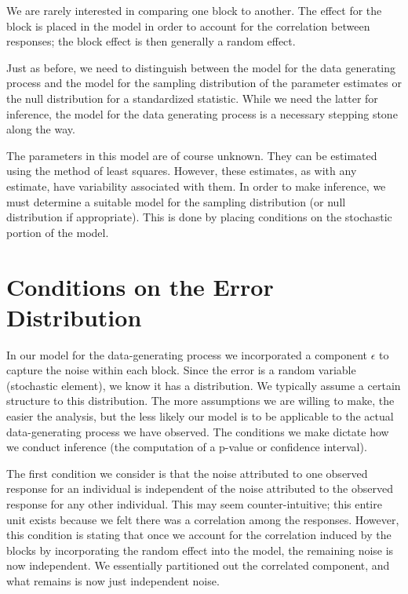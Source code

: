 \documentclass[
]{book}
\theoremstyle{plain}
\theoremstyle{mydefn}
\theoremstyle{myexmpl}
\theoremstyle{remark}
\begin{document}
\begin{rmdtip}
We are rarely interested in comparing one block to another. The effect for the block is placed in the model in order to account for the correlation between responses; the block effect is then generally a random effect.
\end{rmdtip}

Just as before, we need to distinguish between the model for the data generating process and the model for the sampling distribution of the parameter estimates or the null distribution for a standardized statistic. While we need the latter for inference, the model for the data generating process is a necessary stepping stone along the way.

The parameters in this model are of course unknown. They can be estimated using the method of least squares. However, these estimates, as with any estimate, have variability associated with them. In order to make inference, we must determine a suitable model for the sampling distribution (or null distribution if appropriate). This is done by placing conditions on the stochastic portion of the model.

\hypertarget{conditions-on-the-error-distribution-2}{%
\section{Conditions on the Error Distribution}\label{conditions-on-the-error-distribution-2}}

In our model for the data-generating process we incorporated a component \(\epsilon\) to capture the noise within each block. Since the error is a random variable (stochastic element), we know it has a distribution. We typically assume a certain structure to this distribution. The more assumptions we are willing to make, the easier the analysis, but the less likely our model is to be applicable to the actual data-generating process we have observed. The conditions we make dictate how we conduct inference (the computation of a p-value or confidence interval).

The first condition we consider is that the noise attributed to one observed response for an individual is independent of the noise attributed to the observed response for any other individual. This may seem counter-intuitive; this entire unit exists because we felt there was a correlation among the responses. However, this condition is stating that once we account for the correlation induced by the blocks by incorporating the random effect into the model, the remaining noise is now independent. We essentially partitioned out the correlated component, and what remains is now just independent noise.
\end{document}
